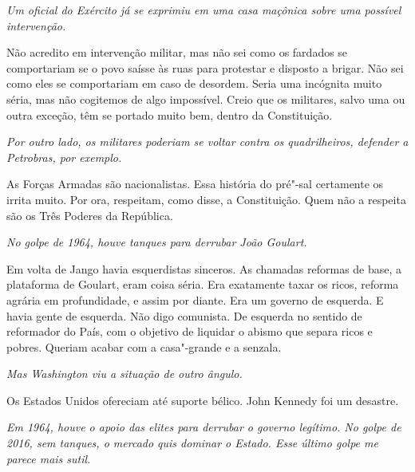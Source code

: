 \itshape
 Um oficial do Exército já se exprimiu em uma casa
maçônica sobre uma possível intervenção.

\normalfont
Não acredito em intervenção militar, mas não sei como os
fardados se comportariam se o povo saísse às ruas para protestar e
disposto a brigar. Não sei como eles se comportariam em caso de
desordem. Seria uma incógnita muito séria, mas não cogitemos de algo
impossível. Creio que os militares, salvo uma ou outra exceção, têm se
portado muito bem, dentro da Constituição.

\itshape
 Por outro lado, os militares poderiam se voltar contra
os quadrilheiros, defender a Petrobras, por exemplo.

\normalfont
As Forças Armadas são nacionalistas. Essa história do
pré"-sal certamente os irrita muito. Por ora, respeitam, como disse, a
Constituição. Quem não a respeita são os Três Poderes da República.


\itshape
No golpe de
1964, houve tanques para derrubar João Goulart.

\normalfont
Em volta de Jango havia esquerdistas sinceros. As
chamadas reformas de base, a plataforma de Goulart, eram coisa séria.
Era exatamente taxar os ricos, reforma agrária em profundidade, e assim
por diante. Era um governo de esquerda. E havia gente de esquerda. Não
digo comunista. De esquerda no sentido de reformador do País, com o
objetivo de liquidar o abismo que separa ricos e pobres. Queriam acabar
com a casa"-grande e a senzala.

\itshape
 Mas Washington viu a situação de outro ângulo.

\normalfont
Os Estados Unidos ofereciam até suporte bélico. John
Kennedy foi um desastre.

\itshape
 Em 1964, houve o apoio das elites para derrubar o
governo legítimo. No golpe de 2016, sem tanques, o mercado quis dominar
o Estado. Esse último golpe me parece mais sutil.

